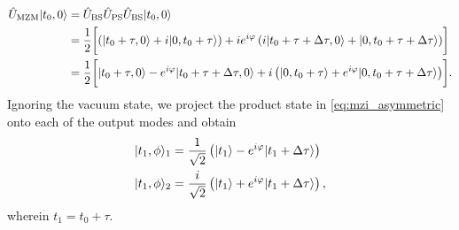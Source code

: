 \begin{equation}
	\begin{split}
		\hat{U}_\text{MZM}
		\lvert t_0,0\rangle
		&=
		\hat{U}_\text{BS}
		\hat{U}_\text{PS}
		\hat{U}_\text{BS}
		\lvert t_0,0\rangle
		\\
		&=
		\frac{1}{2}
		\biggl[
			\left(
				\lvert t_0+\tau,0\rangle
				+
				i\lvert0,t_0+\tau\rangle
			\right)
			+
			ie^{i\varphi}
			\left(
				i\lvert t_0+\tau+\Delta\tau,0\rangle
				+
				\lvert0,t_0+\tau+\Delta\tau\rangle
			\right)
		\biggr]
		\\
		&=
		\frac{1}{2}
		\biggl[
			\lvert t_0+\tau,0\rangle
			-
			e^{i\varphi}
			\lvert t_0+\tau+\Delta\tau,0\rangle
			+
			i
			\left(
				\lvert0,t_0+\tau\rangle
				+
				e^{i\varphi}
				\lvert0,t_0+\tau+\Delta\tau\rangle
			\right)
		\biggr]
		.
	\end{split}
	\label{eq:mzi_asymmetric}
\end{equation}
Ignoring the vacuum state, we project the product state in \cref{eq:mzi_asymmetric} onto each of the output modes and obtain
\begin{align}
	\lvert t_1,\phi\rangle_1
	&=
	\frac{1}{\sqrt{2}}
	\left(
		\lvert t_1\rangle
		-
		e^{i\varphi}
		\lvert t_1+\Delta\tau\rangle
	\right)
	\label{eq:mzi_asymmetric_right}
	\\
	\lvert t_1,\phi\rangle_2
	&=
	\frac{i}{\sqrt{2}}
	\left(
		\lvert t_1\rangle
		+
		e^{i\varphi}
		\lvert t_1+\Delta\tau\rangle
	\right)
	\label{eq:mzi_asymmetric_down}
	,
\end{align}
wherein $t_1=t_0+\tau$.


